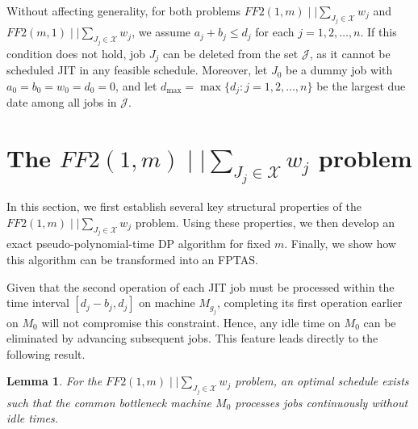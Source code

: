 \documentclass[12pt, eqno, limlimits]{article}
\newtheorem{lemma}{Lemma}[section]
\begin{document}
\begin{sloppypar}
\begin{center}
        \end{center}
        
        Without affecting generality, for both problems $FF2(1, m) \mid \mid \sum_{J_j \in \mathcal{X}} w_j$ and $FF2(m, 1) \mid \mid \sum_{J_j \in \mathcal{X}} w_j$, we assume $a_j+b_j \leq d_j$ for each $j=1, 2, \ldots, n$. If this condition does not hold, job $J_j$ can be deleted from the set $\mathcal{J}$, as it cannot be scheduled JIT in any feasible schedule. Moreover, let $J_0$ be a dummy job with $a_0=b_0=w_0=d_0=0$, and let $d_{\max}=\max\{d_j: j=1, 2, \ldots, n\}$ be the largest due date among all jobs in $\mathcal{J}$.
        
        \section{The $FF2(1, m)\mid \mid \sum_{J_j \in \mathcal{X}} w_j$ problem}
        
        In this section, we first establish several key structural properties of the $FF2(1, m)\mid \mid \sum_{J_j \in \mathcal{X}} w_j$ problem. Using these properties, we then develop an exact pseudo-polynomial-time DP algorithm for fixed $m$. Finally, we show how this algorithm can be transformed into an FPTAS.
        
        Given that the second operation of each JIT job must be processed within the time interval $[d_j-b_j, d_j]$ on 
        machine $M_{g_j}$, completing its first operation earlier on $M_0$ will not compromise this constraint. Hence, any idle time on $M_0$ can be eliminated by advancing subsequent jobs. This feature leads directly to the following result.
        
        \begin{lemma} \label{L-3.1}
            For the $FF2(1, m)\mid \mid \sum_{J_j \in \mathcal{X}} w_j$ problem, an optimal schedule exists such that the common bottleneck machine $M_0$ processes jobs continuously without idle times.
        \end{lemma}
        

\end{sloppypar}
\end{document}
